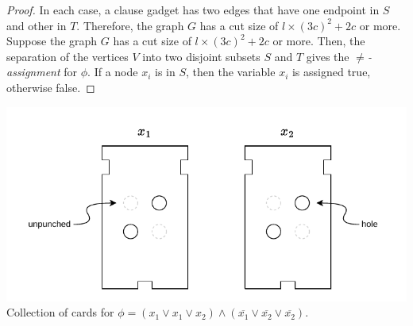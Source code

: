 \documentclass[11pt]{article}
\begin{document}
\begin{proof}
In each case, a clause gadget has two edges that have one endpoint in $S$ and other in $T$. Therefore, the graph $G$ has a cut size of $l \times (3c)^2 + 2c$ or more. \\

Suppose the graph $G$ has a cut size of $l \times (3c)^2 + 2c$ or more. Then, the separation of the vertices $V$ into two disjoint subsets $S$ and $T$ gives the $\neq$\textit{-assignment} for $\phi$. If a node $x_i$ is in $S$, then the variable $x_i$ is assigned true, otherwise false.

\end{proof}

\begin{center}
\includegraphics[scale=1.0]{Figures/Problem7.28.pdf} \\
Collection of cards for $\phi = (x_1 \vee x_1 \vee x_2) \wedge (\overline{x_1} \vee \overline{x_2} \vee \overline{x_2})$.
\end{center}
\end{document}
